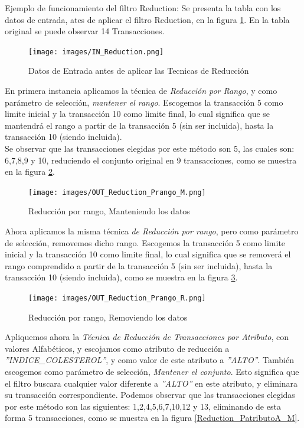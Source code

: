 Ejemplo de funcionamiento del filtro Reduction:
Se presenta la tabla con los datos de entrada, ates de aplicar el filtro Reduction, en la figura \ref{IN_Reduction}.  En la tabla original se puede observar 14 Transacciones. \\

\begin{figure}[h]
\centering
\texttt{[image: images/IN\_Reduction.png]}
\caption{Datos de Entrada antes de aplicar las Tecnicas de Reducci\'on}
\label{IN_Reduction}
\end{figure}

En primera instancia aplicamos la t\'ecnica de \textit{Reducci\'on por Rango},  y como par\'ametro de selecci\'on, \textit{mantener el rango}. Escogemos la transacci\'on 5 como limite inicial y la transacci\'on 10 como limite final, lo cual significa que se mantendr\'a el rango a partir de la transacci\'on 5 (sin ser incluida), hasta la transacci\'on 10 (siendo incluida).\\   
Se observar que las transacciones elegidas por este m\'etodo son 5, las cuales son: 6,7,8,9 y 10, reduciendo el conjunto original en 9 transacciones, como se muestra en la figura \ref{Reduction_Prango_M}.\\

\begin{figure}[h]
\centering
\texttt{[image: images/OUT\_Reduction\_Prango\_M.png]}
\caption{Reducci\'on por rango, Manteniendo los datos}
\label{Reduction_Prango_M}
\end{figure}

Ahora aplicamos la  misma t\'ecnica \textit{de Reducci\'on por rango}, pero como par\'ametro de selecci\'on, removemos dicho rango. Escogemos la transacci\'on 5 como limite inicial y la transacci\'on 10 como limite final, lo cual significa que se remover\'a el rango comprendido a partir de la transacci\'on 5 (sin ser incluida), hasta la transacci\'on 10 (siendo incluida), como se muestra en la figura \ref{Reduction_Prango_R}.\\
   
\begin{figure}[h]
\centering
\texttt{[image: images/OUT\_Reduction\_Prango\_R.png]}
\caption{Reducci\'on por rango, Removiendo los datos}
\label{Reduction_Prango_R}
\end{figure}

Apliquemos ahora la \textit{T\'ecnica de  Reducci\'on de Transacciones por Atributo}, con valores Alfab\'eticos, y escojamos como atributo de reducci\'on a \textit{''INDICE\_COLESTEROL''}, y como valor de este atributo a \textit{''ALTO''}. Tambi\'en escogemos como par\'ametro de selecci\'on, \textit{Mantener el conjunto}. Esto significa que el filtro buscara cualquier valor diferente a \textit{''ALTO''} en este atributo, y eliminara su transacci\'on correspondiente.
Podemos observar que las transacciones elegidas por este m\'etodo son las siguientes: 1,2,4,5,6,7,10,12 y 13, eliminando de esta forma 5 transacciones, como se muestra en la figura \ref{Reduction_PatributoA_M}.\\
   
